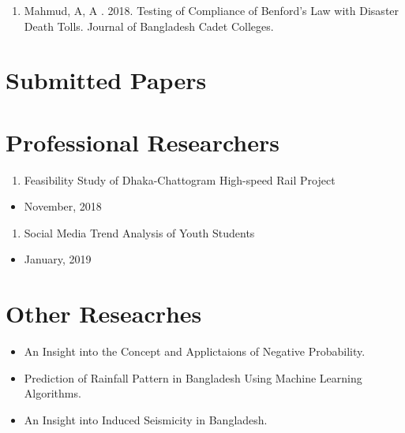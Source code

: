 \documentclass[
]{book}
\providecommand{\tightlist}{%
  \setlength{\itemsep}{0pt}\setlength{\parskip}{0pt}}
\begin{document}
\begin{enumerate}
\def\labelenumi{\arabic{enumi}.}
\tightlist
\item
  Mahmud, A, A . 2018. Testing of Compliance of Benford's Law with Disaster
  Death Tolls. Journal of Bangladesh Cadet Colleges.
\end{enumerate}

\hypertarget{submitted-papers}{%
\section*{Submitted Papers}\label{submitted-papers}}

\hypertarget{professional-researchers}{%
\section*{Professional Researchers}\label{professional-researchers}}

\begin{enumerate}
\def\labelenumi{\arabic{enumi}.}
\tightlist
\item
  Feasibility Study of Dhaka-Chattogram High-speed Rail Project
\end{enumerate}

\begin{itemize}
\tightlist
\item
  November, 2018
\end{itemize}

\begin{enumerate}
\def\labelenumi{\arabic{enumi}.}
\setcounter{enumi}{1}
\tightlist
\item
  Social Media Trend Analysis of Youth Students
\end{enumerate}

\begin{itemize}
\tightlist
\item
  January, 2019
\end{itemize}

\hypertarget{other-reseacrhes}{%
\section{Other Reseacrhes}\label{other-reseacrhes}}

\begin{itemize}
\tightlist
\item
  An Insight into the Concept and Applictaions of Negative Probability.
\item
  Prediction of Rainfall Pattern in Bangladesh Using Machine Learning Algorithms.
\item
  An Insight into Induced Seismicity in Bangladesh.
\end{itemize}
\end{document}
